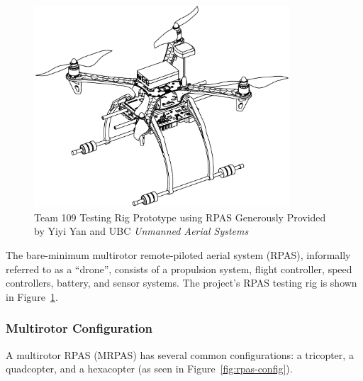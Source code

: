 \begin{figure}[H]
    \centering
    \includegraphics[width=0.85\textwidth]{img/testrigcad1.png}
    \caption[Team 109 Testing Rig Prototype]{Team 109 Testing Rig Prototype using RPAS Generously Provided by Yiyi Yan and UBC \textit{Unmanned Aerial Systems}}
    \label{fig:testrigcad1}
\end{figure}

The bare-minimum multirotor remote-piloted aerial system (RPAS), informally referred to as a ``drone'', consists of a propulsion system, flight controller, speed controllers, battery, and sensor systems. The project's RPAS testing rig is shown in Figure~\ref{fig:testrigcad1}.

\subsubsection{Multirotor Configuration}

A multirotor RPAS (MRPAS) has several common configurations: a tricopter, a quadcopter, and a hexacopter (as seen in Figure~\ref{fig:rpas-config}).

